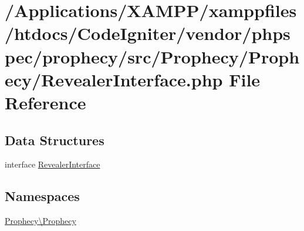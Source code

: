 \hypertarget{_revealer_interface_8php}{}\section{/\+Applications/\+X\+A\+M\+P\+P/xamppfiles/htdocs/\+Code\+Igniter/vendor/phpspec/prophecy/src/\+Prophecy/\+Prophecy/\+Revealer\+Interface.php File Reference}
\label{_revealer_interface_8php}
\subsection*{Data Structures}
\begin{DoxyCompactItemize}
\item 
interface \mbox{\hyperlink{interface_prophecy_1_1_prophecy_1_1_revealer_interface}{Revealer\+Interface}}
\end{DoxyCompactItemize}
\subsection*{Namespaces}
\begin{DoxyCompactItemize}
\item 
 \mbox{\hyperlink{namespace_prophecy_1_1_prophecy}{Prophecy\textbackslash{}\+Prophecy}}
\end{DoxyCompactItemize}
